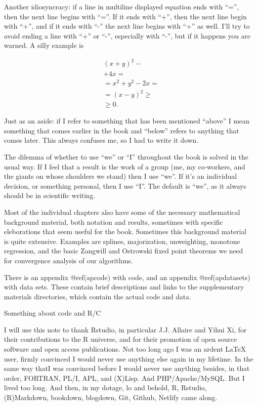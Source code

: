 \documentclass[
  12pt,
  letterpaper,
  DIV=11,
  numbers=noendperiod]{scrreprt}
\theoremstyle{remark}
\begin{document}
Another idiosyncracy: if a line in multiline displayed equation ends
with ``='', then the next line begins with ``=''. If it ends with ``+'',
then the next line begin with ``+'', and if it ends with ``-'' the next
line begins with ``+'' as well. I'll try to avoid ending a line with
``+'' or ``-'', especially with ``-'', but if it happens you are warned.
A silly example is

\begin{align}
&(x+y)^2-\\
&+4x=\\
&=x^2+y^2-2x=\\
&=(x-y)^2\geq\\
&\geq 0.
\end{align}

Just as an aside: if I refer to something that has been mentioned
``above'' I mean something that comes earlier in the book and ``below''
refers to anything that comes later. This always confuses me, so I had
to write it down.

The dilemma of whether to use ``we'' or ``I'' throughout the book is
solved in the usual way. If I feel that a result is the work of a group
(me, my co-workers, and the giants on whose shoulders we stand) then I
use ``we''. If it's an individual decision, or something personal, then
I use ``I''. The default is ``we'', as it always should be in scientific
writing.

Most of the individual chapters also have some of the necessary
mathematical background material, both notation and results, sometimes
with specific eleborations that seem useful for the book. Sometimes this
background material is quite extensive. Examples are splines,
majorization, unweighting, monotone regression, and the basic Zangwill
and Ostrowski fixed point theorems we need for convergence analysis of
our algorithms.

There is an appendix @ref(apcode) with code, and an appendix
@ref(apdatasets) with data sets. These contain brief descriptions and
links to the supplementary materials directories, which contain the
actual code and data.

Something about code and R/C

I will use this note to thank Rstudio, in particular J.J. Allaire and
Yihui Xi, for their contributions to the R universe, and for their
promotion of open source software and open access publications. Not too
long ago I was an ardent LaTeX user, firmly convinced I would never use
anything else again in my lifetime. In the same way thatI was convinced
before I would never use anything besides, in that order, FORTRAN, PL/I,
APL, and (X)Lisp. And PHP/Apache/MySQL. But I lived too long. And then,
in my dotage, lo and behold, R, Rstudio, (R)Markdown, bookdown,
blogdown, Git, Github, Netlify came along.
\end{document}
